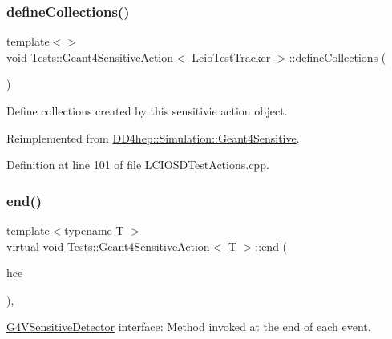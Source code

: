 \subsubsection{\texorpdfstring{define\+Collections()}{defineCollections()}\hspace{0.1cm}{\footnotesize\ttfamily [2/2]}}
{\footnotesize\ttfamily template$<$$>$ \\
void \hyperlink{class_tests_1_1_geant4_sensitive_action}{Tests\+::\+Geant4\+Sensitive\+Action}$<$ \hyperlink{class_tests_1_1_lcio_test_tracker}{Lcio\+Test\+Tracker} $>$\+::define\+Collections (\begin{DoxyParamCaption}{ }\end{DoxyParamCaption})\hspace{0.3cm}{\ttfamily [virtual]}}



Define collections created by this sensitivie action object. 



Reimplemented from \hyperlink{class_d_d4hep_1_1_simulation_1_1_geant4_sensitive_a88c872b79e49e399c8ee282960c2d77d}{D\+D4hep\+::\+Simulation\+::\+Geant4\+Sensitive}.



Definition at line 101 of file L\+C\+I\+O\+S\+D\+Test\+Actions.\+cpp.

\hypertarget{class_tests_1_1_geant4_sensitive_action_aeeb492550f054b8dd9f4780601fc1d66}{}\label{class_tests_1_1_geant4_sensitive_action_aeeb492550f054b8dd9f4780601fc1d66} 
\subsubsection{\texorpdfstring{end()}{end()}}
{\footnotesize\ttfamily template$<$typename T $>$ \\
virtual void \hyperlink{class_tests_1_1_geant4_sensitive_action}{Tests\+::\+Geant4\+Sensitive\+Action}$<$ \hyperlink{class_t}{T} $>$\+::end (\begin{DoxyParamCaption}\item[{G4\+H\+Cof\+This\+Event $\ast$}]{hce }\end{DoxyParamCaption})\hspace{0.3cm}{\ttfamily [inline]}, {\ttfamily [virtual]}}



\hyperlink{class_g4_v_sensitive_detector}{G4\+V\+Sensitive\+Detector} interface\+: Method invoked at the end of each event. 




